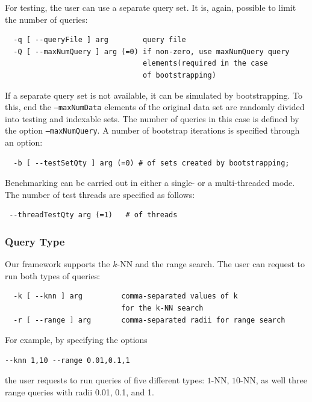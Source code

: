 \documentclass[runningheads,a4paper]{llncs}
\newcommand{\ttt}[1]{\texttt{#1}}
\newcommand{\knn}{$k$-NN }
\begin{document}
{For testing, the user can use a separate query set.
It is, again, possible to limit the number of queries:
\begin{verbatim}
  -q [ --queryFile ] arg        query file
  -Q [ --maxNumQuery ] arg (=0) if non-zero, use maxNumQuery query 
                                elements(required in the case 
                                of bootstrapping)
\end{verbatim}
If a separate query set is not available, it can be simulated by bootstrapping.
To this, end the \ttt{--maxNumData} elements of the original data set
are randomly divided into testing and indexable sets.
The number of queries in this case is defined by the option \ttt{--maxNumQuery}.
A number of bootstrap iterations is specified through an option:
\begin{verbatim}
  -b [ --testSetQty ] arg (=0) # of sets created by bootstrapping; 
\end{verbatim}
Benchmarking can be carried out in either a single- or a multi-threaded
mode. The number of test threads are specified as follows:
\begin{verbatim}
 --threadTestQty arg (=1)   # of threads
\end{verbatim}

\subsubsection{Query Type} 
Our framework supports the \knn and the range search.
The user can request to run both types of queries:
\begin{verbatim}
  -k [ --knn ] arg         comma-separated values of k 
                           for the k-NN search
  -r [ --range ] arg       comma-separated radii for range search
\end{verbatim}
For example, by specifying the options 
\begin{verbatim}
--knn 1,10 --range 0.01,0.1,1
\end{verbatim}
the user requests to run queries of five different types: $1$-NN, $10$-NN,
as well three range queries with radii 0.01, 0.1, and 1.

}
\end{document}
